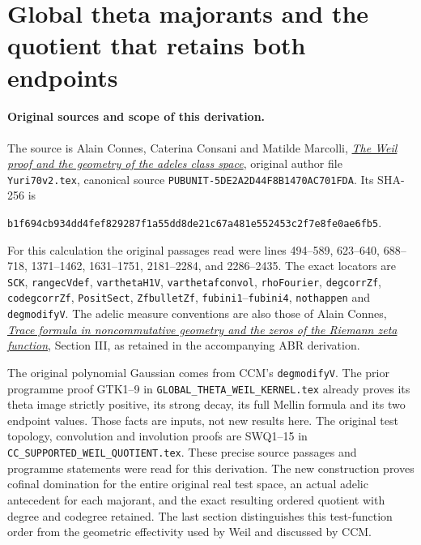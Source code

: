 \section{Global theta majorants and the quotient that retains both endpoints}
\label{sec:cc-theta-order-cofinality}

\paragraph{Original sources and scope of this derivation.}
The source is Alain Connes, Caterina Consani and Matilde Marcolli,
\href{https://arxiv.org/abs/math/0703392v1}{\emph{The Weil proof and the
geometry of the adeles class space}}, original author file
\nolinkurl{Yuri70v2.tex}, canonical source
\texttt{PUBUNIT-5DE2A2D44F8B1470AC701FDA}. Its SHA-256 is
\par\noindent
\nolinkurl{b1f694cb934dd4fef829287f1a55dd8de21c67a481e552453c2f7e8fe0ae6fb5}.
\par
For this calculation the original passages read were lines 494--589,
623--640, 688--718, 1371--1462, 1631--1751, 2181--2284,
and 2286--2435. The exact locators are \texttt{SCK},
\texttt{rangecVdef}, \texttt{varthetaH1V}, \texttt{varthetafconvol},
\texttt{rhoFourier}, \texttt{degcorrZf}, \texttt{codegcorrZf},\newline
\texttt{PositSect}, \texttt{ZfbulletZf}, \texttt{fubini1}--\texttt{fubini4},
\texttt{nothappen} and \texttt{degmodifyV}.
The adelic measure conventions are also those of Alain Connes,
\href{https://arxiv.org/abs/math/9811068v1}{\emph{Trace formula in
noncommutative geometry and the zeros of the Riemann zeta function}},
Section III, as retained in the accompanying ABR derivation.

The original polynomial Gaussian comes from CCM's
\texttt{degmodifyV}. The prior programme proof GTK1--9 in
\nolinkurl{GLOBAL_THETA_WEIL_KERNEL.tex} already proves its theta image
strictly positive, its strong decay, its full Mellin formula and its
two endpoint values. Those facts are inputs, not new results here.
The original test topology, convolution and involution proofs are SWQ1--15 in
\nolinkurl{CC_SUPPORTED_WEIL_QUOTIENT.tex}. These precise source
passages and programme statements were read for this derivation.
The new construction proves cofinal domination for the entire original
real test space, an actual adelic antecedent for each majorant, and the
exact resulting ordered quotient with degree and codegree retained.
The last section distinguishes this test-function order from the
geometric effectivity used by Weil and discussed by CCM.

